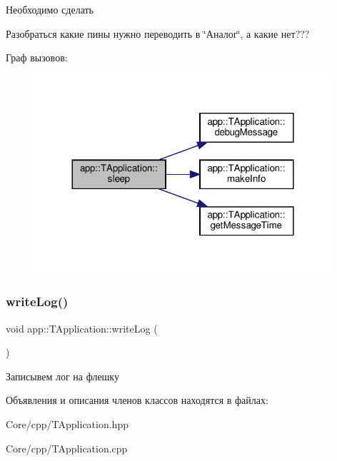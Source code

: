  \begin{DoxyRefDesc}{Необходимо сделать}
\item[\hyperlink{todo__todo000003}{Необходимо сделать}]Разобраться какие пины нужно переводить в \char`\"{}Аналог\char`\"{}, а какие нет??? \end{DoxyRefDesc}
Граф вызовов\+:\nopagebreak
\begin{figure}[H]
\begin{center}
\leavevmode
\includegraphics[width=312pt]{classapp_1_1_t_application_ab44dd5aa2afe1d66b2588e908bfad4d0_cgraph}
\end{center}
\end{figure}
\mbox{\label{classapp_1_1_t_application_a8c4bf0b62709ad4abd9c9027f1f58106}} 
\subsubsection{\texorpdfstring{write\+Log()}{writeLog()}}
{\footnotesize\ttfamily void app\+::\+T\+Application\+::write\+Log (\begin{DoxyParamCaption}{ }\end{DoxyParamCaption})}



Записывем лог на флешку 



 

Объявления и описания членов классов находятся в файлах\+:\begin{DoxyCompactItemize}
\item 
Core/cpp/T\+Application.\+hpp\item 
Core/cpp/T\+Application.\+cpp\end{DoxyCompactItemize}
